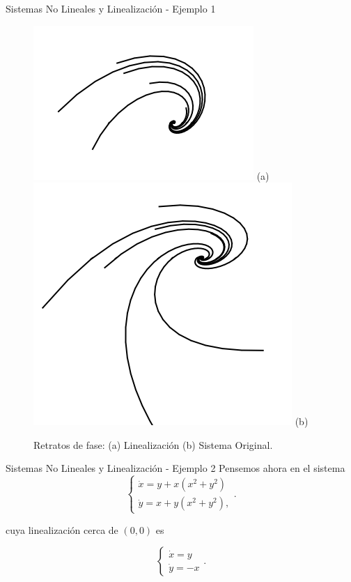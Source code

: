 \documentclass{beamer}
\begin{document}
\begin{frame}{Sistemas No Lineales y Linealización - Ejemplo 1}
\begin{figure}
	\includegraphics[scale=0.4]{figures/nonlinear-linealization.png} (a)
	\includegraphics[scale=0.4]{../figures/nolinealhiperbolico-espiral.png} (b)
	\caption{Retratos de fase: (a) Linealización (b) Sistema Original.}
\end{figure}
\end{frame}

\begin{frame}{Sistemas No Lineales y Linealización - Ejemplo 2}
Pensemos ahora en el sistema
$$ \left\{
	\begin{array}{l}
		\dot{x} = y + x(x^2 + y^2) \\
		\dot{y} = x + y(x^2 + y^2),
	\end{array} \right..
$$

cuya linealización cerca de $(0,0)$ es

$$ \left\{
	\begin{array}{l} \dot{x} = y \\ \dot{y} = -x \end{array} \right..
$$
\end{frame}
\end{document}
